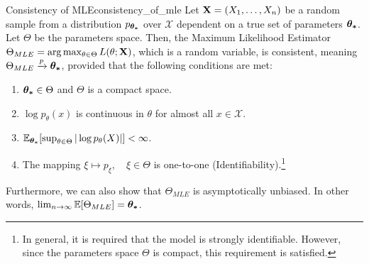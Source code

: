 \begin{proposition}{Consistency of MLE}{consistency_of_mle}
    Let ${\bf X}=(X_1, \dots, X_n)$ be a random sample from a distribution $p_{\boldsymbol{\theta_*}}$ over $\mathcal{X}$ dependent on a true set of parameters $\boldsymbol{\theta_*}$. Let $\Theta$ be the parameters space. Then, the Maximum Likelihood Estimator $\Theta_{MLE} = \arg\max_{\theta\in\Theta}L(\theta;{\bf X})$, which is a random variable, is consistent, meaning $\Theta_{MLE}\xrightarrow{p}\boldsymbol{\theta_*}$, provided that the following conditions are met:
    \begin{enumerate}
        \item $\boldsymbol{\theta_*}\in\Theta$ and $\Theta$ is a compact space. 
        \item $\log p_\theta(x)$ is continuous in $\theta$ for almost all $x\in\mathcal{X}$.
        \item $\mathbb{E}_{\boldsymbol{\theta_*}}[\sup_{\theta\in\Theta}|\log p_\theta(X)|] < \infty$.
        \item The mapping $\xi\mapsto p_\xi, \quad \xi\in\Theta$ is one-to-one (Identifiability).\footnote{In general, it is required that the model is strongly identifiable. However, since the parameters space $\Theta$ is compact, this requirement is satisfied.}
    \end{enumerate} 
    
    \noindent Furthermore, we can also show that $\Theta_{MLE}$ is asymptotically unbiased. In other words, $\lim_{n\to\infty}\mathbb{E}[\Theta_{MLE}] = \boldsymbol{\theta_*}$.
\end{proposition} 

